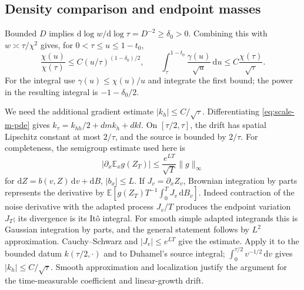 \documentclass[11pt,a4paper]{article}
\numberwithin{equation}{section}
\theoremstyle{definition}
\theoremstyle{remark}
\newcommand{\E}{\mathbb E}
\newcommand{\dd}{\mathrm d}
\begin{document}
\subsection{Density comparison and endpoint masses}

Bounded $D$ implies $\dd\log w/\dd\log\tau=D^{-2}\ge\delta_0>0$.
Combining this with $w\asymp\tau/\chi^2$ gives, for
$0<\tau\le u\le1-t_0$,
\begin{equation}\label{eq:src28}
 \frac{\chi(u)}{\chi(\tau)}\le C(u/\tau)^{(1-\delta_0)/2},
 \qquad
 \int_\tau^{1-t_0}\frac{\gamma(u)}{\sqrt u}\,\dd u
 \le C\frac{\chi(\tau)}{\sqrt\tau}.
\end{equation}
For the integral use $\gamma(u)\le\chi(u)/u$ and integrate the first
bound; the power in the resulting integral is $-1-\delta_0/2$.

We need the additional gradient estimate $|k_h|\le C/\sqrt\tau$.
Differentiating \eqref{eq:scale-m-pde} gives
$k_\tau=k_{hh}/2+d m k_h+dkl$. On $[\tau/2,\tau]$, the drift has
spatial Lipschitz constant at most $2/\tau$, and the source is bounded
by $2/\tau$. For completeness, the semigroup estimate used here is
\[
 |\partial_x\E_x g(Z_T)|\le
 \frac{e^{LT}}{\sqrt T}\|g\|_\infty
\]
for $\dd Z=b(v,Z)\,\dd v+\dd B$, $|b_x|\le L$.
If $J_v=\partial_xZ_v$, Brownian integration by parts represents the
derivative by
$\E[g(Z_T)T^{-1}\int_0^T J_v\,\dd B_v]$.
Indeed contraction of the noise derivative with the adapted process
$J_v/T$ produces the endpoint variation $J_T$; its divergence is its
It\^o integral. For smooth simple adapted integrands this is Gaussian
integration by parts, and the general statement follows by
$L^2$ approximation. Cauchy--Schwarz and $|J_v|\le e^{LT}$ give the
estimate. Apply it to the bounded datum $k(\tau/2,\cdot)$ and to
Duhamel's source integral; $\int_0^{\tau/2}v^{-1/2}\,\dd v$ gives
$|k_h|\le C/\sqrt\tau$. Smooth approximation and localization justify
the argument for the time-measurable coefficient and linear-growth
drift.
\end{document}
